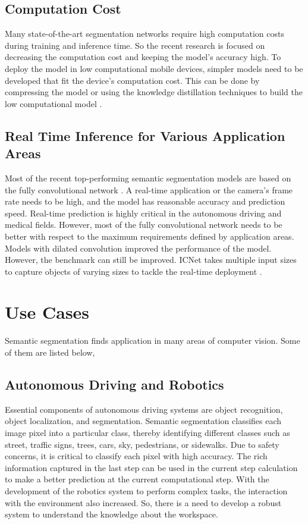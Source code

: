     \subsection{Computation Cost}
    
    Many state-of-the-art segmentation networks require high computation costs during training and inference time. So the recent research is focused on decreasing the computation cost and keeping the model's accuracy high. To deploy the model in low computational mobile devices, simpler models need to be developed that fit the device's computation cost. This can be done by compressing the model or using the knowledge distillation techniques to build the low computational model \cite{25_minaee2021image}. 
    
    \subsection{Real Time Inference for Various Application Areas}
	
	Most of the recent top-performing semantic segmentation models are based on the fully convolutional network \cite{31_chen2014semantic}. A real-time application or the camera's frame rate needs to be high, and the model has reasonable accuracy and prediction speed. Real-time prediction is highly critical in the autonomous driving and medical fields. However, most of the fully convolutional network needs to be better with respect to the maximum requirements defined by application areas. Models with dilated convolution improved the performance of the model. However, the benchmark can still be improved. ICNet takes multiple input sizes to capture objects of varying sizes to tackle the real-time deployment \cite{32_zhao2018icnet}.       

	\section{Use Cases}
	
	Semantic segmentation finds application in many areas of computer vision. Some of them are listed below,
	\subsection{Autonomous Driving and Robotics}
	
	Essential components of autonomous driving systems are object recognition, object localization, and segmentation. Semantic segmentation classifies each image pixel into a particular class, thereby identifying different classes such as street, traffic signs, trees, cars, sky, pedestrians, or sidewalks. Due to safety concerns, it is critical to classify each pixel with high accuracy. The rich information captured in the last step can be used in the current step calculation to make a better prediction at the current computational step. With the development of the robotics system to perform complex tasks, the interaction with the environment also increased. So, there is a need to develop a robust system to understand the knowledge about the workspace. 
	 

